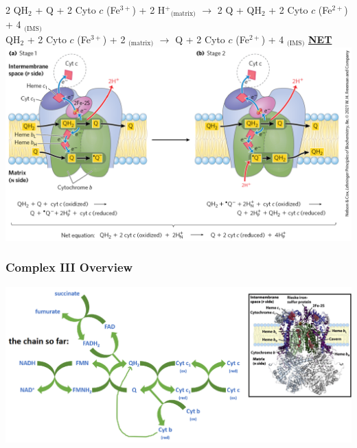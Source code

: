 \documentclass[10pt]{article}
\newcommand{\proton}{\text{H$^+$}}
\newcommand{\pc}{$^+$}
\begin{document}
\begin{center} 
	2 QH$_2$ + Q + 2 Cyto $c$ (Fe$^{3+}$) + 2 H\pc$_{\text{(matrix)}}$ $\rightarrow$ 2 Q + QH$_2$ + 2 Cyto $c$ (Fe$^{2+}$) + 4 \proton$_{\text{(IMS)}}$\\
    QH$_2$ + 2 Cyto $c$ (Fe$^{3+}$) + 2 \proton$_{\text{(matrix)}}$ $\rightarrow$ Q + 2 Cyto $c$ (Fe$^{2+}$) + 4 \proton$_{\text{(IMS)}}$ \hspace{1cm} \textbf{\underline{NET}}\\
    \includegraphics*[width=\textwidth]{L2_15.png} 
\end{center}

\subsubsection*{Complex III Overview}
\begin{center} 
    \includegraphics*[width=\textwidth]{L2_16.png} 
\end{center}
\end{document}
